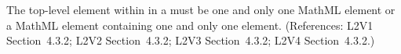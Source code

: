 The top-level element within  in a \FunctionDefinition must be
one and only one MathML  element or a MathML
 element containing one and only one 
element.  (References: L2V1 Section~4.3.2; L2V2 Section~4.3.2;
L2V3 Section~4.3.2; L2V4 Section~4.3.2.)
